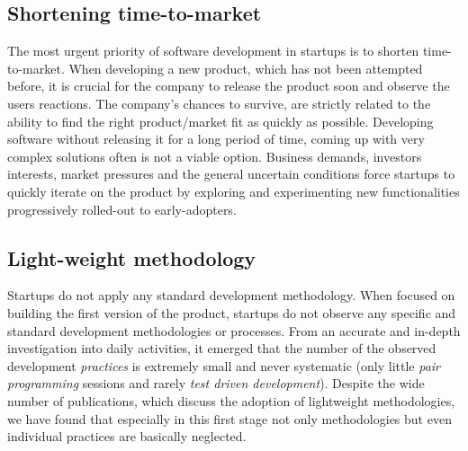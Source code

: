 \documentclass[10pt,journal,letterpaper,compsoc]{IEEEtran}
\begin{document}
\subsection{Shortening time-to-market}

The most urgent priority of software development in startups is to shorten 
time-to-market. When developing a new product, which has not been attempted 
before, it is crucial for the company to release the product soon and observe 
the users reactions. The company's chances to survive, are strictly related to 
the ability to find the right product/market fit as quickly as possible. 
Developing software without releasing it for a long period of time, coming up 
with very complex solutions often is not a viable option. Business demands, 
investors interests, market pressures and the general uncertain conditions force 
startups to quickly iterate on the product by exploring and experimenting new 
functionalities progressively rolled-out to early-adopters.


\subsection{Light-weight methodology}
Startups do not apply any standard development methodology. When focused 
on building the first version of the product, startups do not observe any 
specific and standard development methodologies or processes.  From an accurate 
and in-depth investigation into daily activities, it emerged that the number of  
the observed development \textit{practices} is extremely small and never 
systematic (only little \textit{pair programming} sessions and rarely 
\textit{test driven development}). Despite the wide number of publications, 
which discuss the adoption of lightweight methodologies, we have found that 
especially in this first stage not only methodologies but even individual 
practices are basically neglected. 
\end{document}
